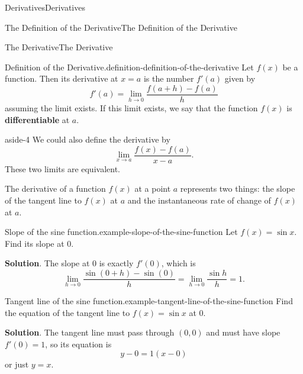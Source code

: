\documentclass[10pt,]{book}
\newcommand{\terminology}[1]{\textbf{#1}}
\numberwithin{equation}{section}
\begin{document}
\begin{chapterptx}{Derivatives}{}{Derivatives}{}{}
\begin{sectionptx}{The Definition of the Derivative}{}{The Definition of the Derivative}{}{}
\begin{subsectionptx}{The Derivative}{}{The Derivative}{}{}
\begin{definition}{Definition of the Derivative.}{definition-definition-of-the-derivative}%
\hypertarget{p-93}{}%
Let \(f(x)\) be a function. Then its derivative at \(x=a\) is the number \(f'(a)\) given by%
\begin{equation*}
f'(a) = \lim_{h\to0}\frac{f(a+h)-f(a)}{h}
\end{equation*}
assuming the limit exists. If this limit exists, we say that the function \(f(x)\) is \terminology{differentiable} at \(a\).%
\end{definition}
\begin{aside}{}{aside-4}%
\hypertarget{p-94}{}%
We could also define the derivative by%
\begin{equation*}
\lim_{x\to a}\frac{f(x)-f(a)}{x-a}.
\end{equation*}
These two limits are equivalent.%
\end{aside}
\hypertarget{p-95}{}%
The derivative of a function \(f(x)\) at a point \(a\) represents two things: the slope of the tangent line to \(f(x)\) at \(a\) and the instantaneous rate of change of \(f(x)\) at \(a\).%
\begin{example}{Slope of the sine function.}{example-slope-of-the-sine-function}%
\hypertarget{p-96}{}%
Let \(f(x) = \sin x\). Find its slope at \(0\).%
\par\smallskip%
\noindent\textbf{Solution}.\hypertarget{solution-20}{}\quad%
\hypertarget{p-97}{}%
The slope at \(0\) is exactly \(f'(0)\), which is%
\begin{equation*}
\lim_{h\to0}\frac{\sin(0+h)-\sin(0)}{h} = \lim_{h\to0}\frac{\sin h}{h} = 1.
\end{equation*}
%
\end{example}
\begin{example}{Tangent line of the sine function.}{example-tangent-line-of-the-sine-function}%
\hypertarget{p-98}{}%
Find the equation of the tangent line to \(f(x) = \sin x\) at \(0\).%
\par\smallskip%
\noindent\textbf{Solution}.\hypertarget{solution-21}{}\quad%
\hypertarget{p-99}{}%
The tangent line must pass through \((0,0)\) and must have slope \(f'(0) = 1\), so its equation is%
\begin{equation*}
y-0 = 1(x-0)
\end{equation*}
or just \(y=x\).%
\end{example}
\end{subsectionptx}
\end{sectionptx}

\end{chapterptx}
\end{document}
